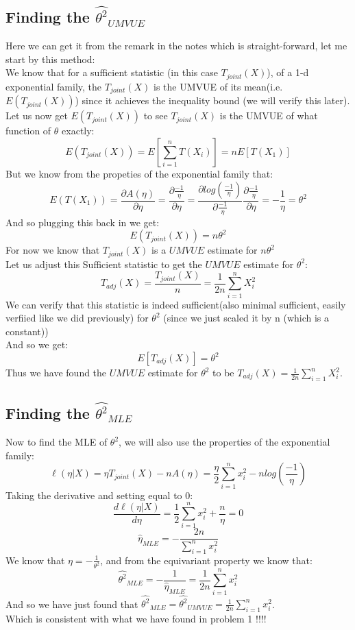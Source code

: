 \documentclass[12pt]{article}
\begin{document}
\subsection*{Finding the $\hat{\theta^2}_{UMVUE}$}
Here we can get it from the remark in the notes which is straight-forward, let me start by this method: 
\\ 
We know that for a sufficient statistic (in this case $T_{joint}(X)$), of a 1-d exponential family, the $T_{joint}(X)$ is the UMVUE of its mean(i.e. $E(T_{joint}(X))$) since it achieves the inequality bound (we will verify this later). \\
Let us now get $E(T_{joint}(X))$ to see $T_{joint}(X)$ is the UMVUE of what function of $\theta$ exactly: 
\[
E(T_{joint}(X))= E[\sum_{i=1}^{n}T(X_i)] = nE[T(X_1)]
\]
But we know from the propeties of the exponential family that:
\[
E(T(X_1)) = \frac{\partial A(\eta)}{\partial \eta} = \frac{\partial \frac{-1}{\eta}}{\partial \eta} = \frac{\partial log(\frac{-1}{\eta})}{\partial \frac{-1}{\eta}} \frac{\partial \frac{-1}{\eta}}{\partial \eta} = -\frac{1}{\eta} = \theta^2
\]
And so plugging this back in we get: 
\[
E(T_{joint}(X)) = n\theta^2
\]
For now we know that $T_{joint}(X)$ is a $UMVUE$ estimate for $n\theta^2$\\
Let us adjust this Sufficient statistic to get the $UMVUE$ estimate for $\theta^2$: 
\[
T_{adj}(X) = \frac{T_{joint}(X)}{n} = \frac{1}{2n}\sum_{i=1}^{n}X_i^2
\]
We can verify that this statistic is indeed sufficient(also minimal sufficient, easily verfiied like we did previously) for $\theta^2$ (since we just scaled it by n (which is a constant))\\
And so we get: 
\[
E[T_{adj}(X)] = \theta^2
\]
Thus we have found the $UMVUE$ estimate for $\theta^2$ to be $T_{adj}(X) = \frac{1}{2n}\sum_{i=1}^{n}X_i^2$. 
\subsection*{Finding the $\hat{\theta^2}_{MLE}$}
Now to find the MLE of $\theta^2$, we will also use the properties of the exponential family: 
\[
\ell(\eta|X) = \eta T_{joint}(X) - n A(\eta)= \frac{\eta}{2}\sum_{i=1}^{n}x_i^2 - nlog(\frac{-1}{\eta})
\]
Taking the derivative and setting equal to 0: 
\[
\frac{d\ell(\eta|X)}{d\eta} = \frac{1}{2}\sum_{i=1}^{n}x_i^2 + \frac{n}{\eta} = 0
\]
\[
\hat{\eta}_{MLE} = -\frac{2n}{\sum_{i=1}^{n}x_i^2}
\]
We know that $\eta=-\frac{1}{\theta^2}$, and from the equivariant property we know that: 
\[
\hat{\theta^2}_{MLE} = -\frac{1}{\hat{\eta}_{MLE}} = \frac{1}{2n}\sum_{i=1}^{n}x_i^2
\]
And so we have just found that $\hat{\theta^2}_{MLE} = \hat{\theta^2}_{UMVUE} = \frac{1}{2n}\sum_{i=1}^{n}x_i^2$. \\ 
Which is consistent with what we have found in problem 1 !!!!
\end{document}
